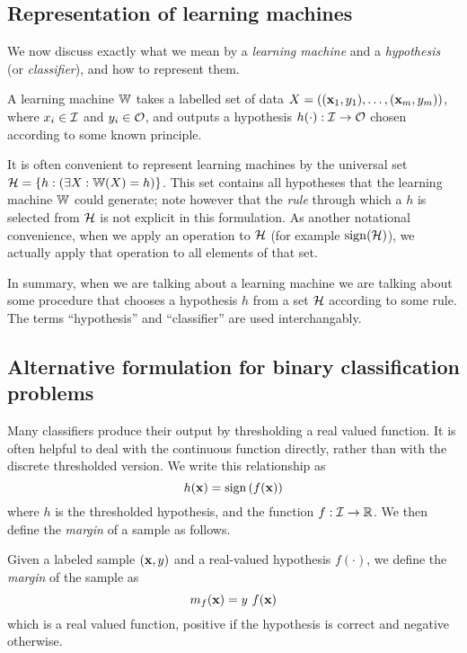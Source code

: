 \subsection{Representation of learning machines}
\label{sec:representation learning machines}

We now discuss exactly what we mean by a \emph{learning machine} and a
\emph{hypothesis} (or \emph{classifier}), and how to represent them.

A learning machine $\mathbb{W}$ takes a labelled set of data $X =
((\mathbf{x}_1, y_1), \ldots, (\mathbf{x}_m, y_m))$, where $x_i \in \mathcal{I}$ and
$y_i \in \mathcal{O}$, and outputs a hypothesis $h(\cdot) : \mathcal{I} \rightarrow
\mathcal{O}$ chosen according to some known principle.

It is often convenient to represent learning machines by the universal
set $\mathcal{H} = \{h : \left( \exists X : \mathbb{W}(X) = h \right) \}$.  This set
contains all hypotheses that the learning machine $\mathbb{W}$ could
generate; note however that the \emph{rule} through which a $h$ is
selected from $\mathcal{H}$ is not explicit in this formulation. 
As another notational convenience, when we apply an operation to $\mathcal{H}$
(for example $\mathrm{sign}(\mathcal{H})$), we actually apply that operation to all
elements of that set.

In summary, when we are talking about a learning machine we are
talking about some procedure that chooses a hypothesis $h$ from a set
$\mathcal{H}$ according to some rule.  The terms ``hypothesis'' and
``classifier'' are used interchangably.


\subsection{Alternative formulation for binary classification problems}
\label{sec:margin formulation}

Many classifiers produce their output by thresholding a real valued
function.  It is often helpful to deal with the continuous function
directly, rather than with the discrete thresholded version.  We write
this relationship as 
%
\begin{equation}
h(\mathbf{x}) = \mathrm{sign} \left( f(\mathbf{x}) \right)
\label{eqn:marginal classification formulation}
\end{equation}
%
where $h$ is the thresholded hypothesis, and the function $f : \mathcal{I}
\rightarrow \mathbb{R}$.  We then define the \emph{margin} of a sample
as follows. 

\begin{definition}
Given a labeled sample $(\mathbf{x}, y)$ and a real-valued hypothesis
$f(\cdot)$, we define the \emph{margin} of the sample as
%
\begin{equation}
m_{f}(\mathbf{x}) = y\ f(\mathbf{x})
\end{equation}
%
which is a real valued function, positive if the hypothesis is correct
and negative otherwise.
\end{definition}

